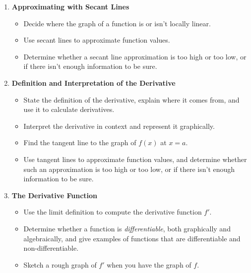 \documentclass{article}
\begin{document}
\begin{enumerate}[start=8, topsep=0pt]
\item \textbf{Approximating with Secant Lines} %
  \begin{itemize}
  \item Decide where the graph of a function is or isn't locally linear.

  \item Use secant lines to approximate function values.

  \item Determine whether a secant line approximation is too high or too low, or if there isn't enough information to be sure.

  \end{itemize}

\item \textbf{Definition and Interpretation of the Derivative} %
  \begin{itemize}
  \item State the definition of the derivative, explain where it comes from, and use it to calculate derivatives.

  \item Interpret the derivative in context and represent it graphically.

  \item Find the tangent line to the graph of $f(x)$ at $x = a$. 

  \item Use tangent lines to approximate function values, and determine whether such an approximation is too high or too low, or if there isn't enough information to be sure.
  \end{itemize}

\item \textbf{The Derivative Function} %
  \begin{itemize}
  \item Use the limit definition to compute the derivative function
    $f'$.

  \item Determine whether a function is \emph{differentiable}, both
    graphically and algebraically, and give examples of functions that
    are differentiable and non-differentiable.

  \item Sketch a rough graph of $f'$ when you have the graph of $f$. 

  \end{itemize}


\end{enumerate}
\end{document}
